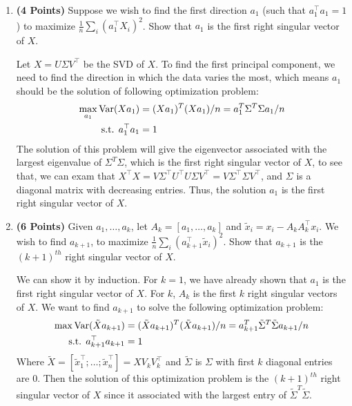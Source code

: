 \begin{enumerate}

\item  \textbf{(4 Points)}
Suppose we wish to find the first direction $a_1$ (such that $a_1^\top a_1 = 1$) to maximize $\frac{1}{n} \sum_i (a_1^\top X_i)^2$.
Show that $a_1$ is the first right singular vector of $X$.

\begin{soln}
Let $X = U\Sigma V^\top$ be the SVD of $X$. To find the first principal component, we need to find the direction in which the data varies the most, which means $a_1$ should be the solution of following optimization problem:
\begin{align*}
  \max_{a_1} \mathrm{Var} (Xa_1) &= (Xa_1)^T(Xa_1)/n = a_1^T \Sigma^T \Sigma a_1/n \\
  \text{s.t. } a_1^\top a_1 &= 1
\end{align*}
The solution of this problem will give the eigenvector associated with the largest eigenvalue of $\Sigma^T \Sigma$, which is the first right singular vector of $X$, to see that, we can exam that $X^\top X = V\Sigma^\top U^\top U\Sigma V^\top = V\Sigma^\top \Sigma V^\top$, and $\Sigma$ is a diagonal matrix with decreasing entries. Thus, the solution $a_1$ is the first right singular vector of $X$.
\end{soln}

\item  \textbf{(6 Points)}
Given $a_1, \dots, a_k$, let $A_k = [a_1, \dots, a_k]$ and 
$\tilde{x}_i = x_i - A_k A_k^\top x_i$. We wish to find $a_{k+1}$, to maximize
$\frac{1}{n} \sum_i (a_{k+1}^\top \tilde{x}_i)^2$. Show that $a_{k+1}$ is the
$(k+1)^{th}$ right singular vector of $X$.

\begin{soln}
  We can show it by induction. For $k=1$, we have already shown that $a_1$ is the first right singular vector of $X$. For $k$, $A_k$ is the first $k$ right singular vectors of $X$. We want to find $a_{k+1}$ to solve the following optimization problem:
  \begin{align*}
    \max \mathrm{Var} (\tilde{X}a_{k+1}) &= (\tilde{X}a_{k+1})^T(\tilde{X}a_{k+1})/n = a_{k+1}^T \tilde{\Sigma}^T \tilde{\Sigma} a_{k+1}/n \\
    \text{s.t. } a_{k+1}^\top a_{k+1} &= 1
  \end{align*}
  Where $\tilde{X} = [\tilde{x}_1^\top; \dots; \tilde{x}_n^\top] = X V_k V_k^\top$ and $\tilde{\Sigma}$ is $\Sigma$ with first $k$ diagonal entries are 0. Then the solution of this optimization problem is the $(k+1)^{th}$ right singular vector of $X$ since it associated with the largest entry of $\tilde{\Sigma}^T \tilde{\Sigma}$.
\end{soln}

\end{enumerate}


